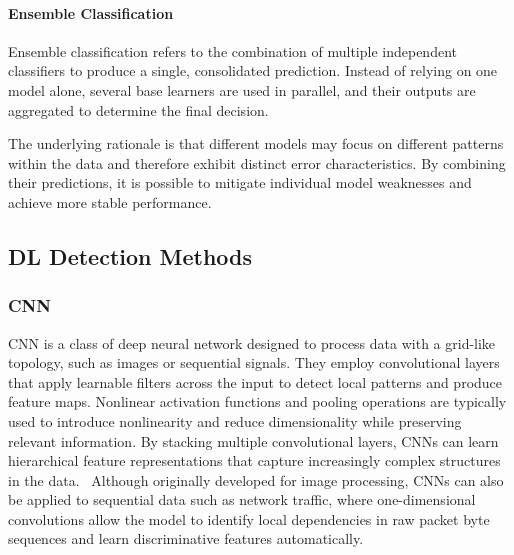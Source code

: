 \paragraph{Ensemble Classification}

Ensemble classification refers to the combination of multiple
independent classifiers to produce a single, consolidated prediction.
Instead of relying on one model alone, several base learners are
used in parallel, and their outputs are aggregated to determine
the final decision.~\cite{hastie2009}

The underlying rationale is that different models may focus on
different patterns within the data and therefore exhibit distinct
error characteristics. By combining their predictions, it is possible
to mitigate individual model weaknesses and achieve more stable
performance.

\subsection{\ac{DL} Detection Methods}
\subsubsection{\ac{CNN}}  

\ac{CNN} is a class of deep neural network
designed to process data with a grid-like topology, such as images or
sequential signals. They employ convolutional layers that apply
learnable filters across the input to detect local patterns and produce
feature maps. Nonlinear activation functions and pooling operations are
typically used to introduce nonlinearity and reduce dimensionality while
preserving relevant information. By stacking multiple convolutional
layers, \ac{CNN}s can learn hierarchical feature representations that capture
increasingly complex structures in the data.~\cite{goodfellow2016}
Although originally developed for image processing, \ac{CNN}s can also be applied to sequential data such as
network traffic, where one-dimensional convolutions allow the model to
identify local dependencies in raw packet byte sequences and learn
discriminative features automatically.~\cite{aldwairi2019}

